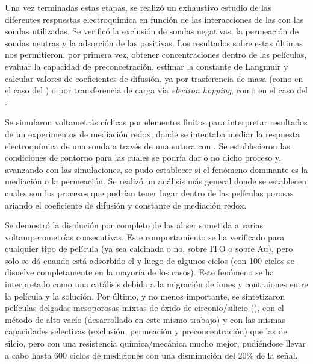 	Una vez terminadas estas etapas, se realizó un exhaustivo estudio de las diferentes respuestas electroquímica en función de las interacciones de las \pdm\space con las sondas utilizadas. Se verificó la exclusión de sondas negativas, la permeación de sondas neutras y la adsorción de las positivas. Los resultados sobre estas últimas nos permitieron, por primera vez, obtener concentraciones dentro de las películas, evaluar la capacidad de preconcetración, estimar la constante de Langmuir y calcular valores de coeficientes de difusión, ya por trasferencia de masa (como en el caso del \fc) o por transferencia de carga vía \textit{electron hopping}, como en el caso del \ru.

	Se simularon voltametrás cíclicas por elementos finitos para interpretar resultados de un experimentos de mediación redox, donde se intentaba mediar la respuesta electroquímica de una sonda a través de una \pdm\space sutura con \ru. Se establecieron las condiciones de contorno para las cuales se podría dar o no dicho proceso y, avanzando con las simulaciones, se pudo establecer si el fenómeno dominante es la mediación o la permeación. Se realizó un análisis más general donde se establecen cuales son los procesos que podrían tener lugar dentro de las películas porosas ariando el coeficiente de difusión y constante de mediación redox.

	Se demostró la disolución por completo de las \pdmF\space al ser sometida a varias voltamperometrías consecutivas. Este comportamiento se ha verificado para cualquier tipo de película (ya sea calcinada o no, sobre ITO o sobre Au), pero solo se dá cuando está adsorbido el \aminorutenio y luego de algunos ciclos (con 100 ciclos se disuelve completamente en la mayoría de los casos). Este fenómeno se ha interpretado como una catálisis debida a la migración de iones y contraiones entre la película y la solución. Por último, y no menos importante, se sintetizaron películas delgadas mesoporosas mixtas de óxido de circonio/silicio (\pdmZ), con el método de alto vacío (desarrollado en este mismo trabajo) y con las mismas capacidades selectivas (exclusión, permeación y preconcentración) que las de silcio, pero con una resistencia química/mecánica mucho mejor, pudiéndose llevar a cabo hasta 600 ciclos de mediciones con una disminución del 20\% de la señal.



